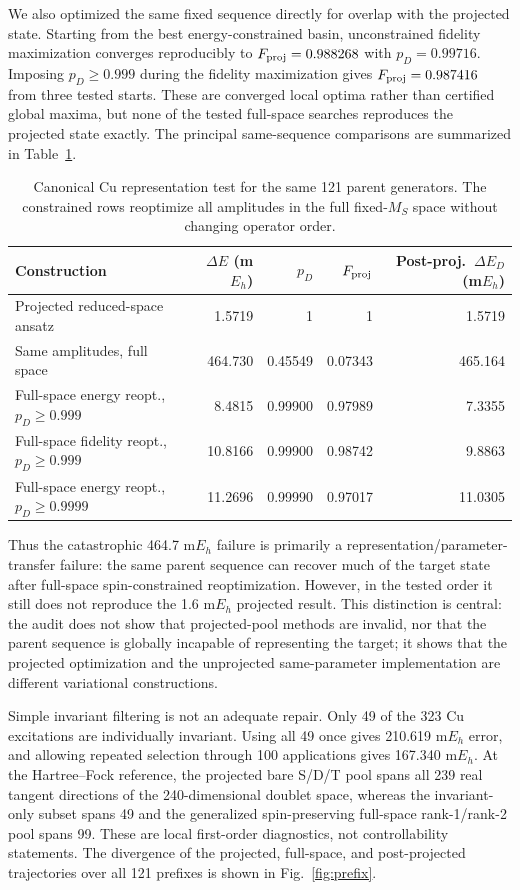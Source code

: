 \documentclass[
 aip,
 jcp,
 amsmath,amssymb,
 preprint
]{revtex4-2}
\begin{document}
We also optimized the same fixed sequence directly for overlap with the projected state.
Starting from the best energy-constrained basin, unconstrained fidelity maximization converges reproducibly to
$F_{\rm proj}=0.988268$ with $p_D=0.99716$.
Imposing $p_D\ge0.999$ during the fidelity maximization gives
$F_{\rm proj}=0.987416$ from three tested starts.
These are converged local optima rather than certified global maxima, but none of the tested full-space searches reproduces the projected state exactly.
The principal same-sequence comparisons are summarized in Table~\ref{tab:parent_reopt}.

\begin{table}[htbp]
\centering
\small
\caption{Canonical Cu representation test for the same 121 parent generators. The constrained rows reoptimize all amplitudes in the full fixed-$M_S$ space without changing operator order.}
\label{tab:parent_reopt}
\begin{tabular}{lrrrr}
\toprule
Construction & $\Delta E$ (m$E_h$) & $p_D$ & $F_{\rm proj}$ & Post-proj.\ $\Delta E_D$ (m$E_h$)\\
\midrule
Projected reduced-space ansatz & 1.5719 & 1 & 1 & 1.5719\\
Same amplitudes, full space & 464.730 & 0.45549 & 0.07343 & 465.164\\
Full-space energy reopt., $p_D\ge0.999$ & 8.4815 & 0.99900 & 0.97989 & 7.3355\\
Full-space fidelity reopt., $p_D\ge0.999$ & 10.8166 & 0.99900 & 0.98742 & 9.8863\\
Full-space energy reopt., $p_D\ge0.9999$ & 11.2696 & 0.99990 & 0.97017 & 11.0305\\
\bottomrule
\end{tabular}
\end{table}

Thus the catastrophic 464.7 m$E_h$ failure is primarily a representation/parameter-transfer failure: the same parent sequence can recover much of the target state after full-space spin-constrained reoptimization.
However, in the tested order it still does not reproduce the 1.6 m$E_h$ projected result.
This distinction is central: the audit does not show that projected-pool methods are invalid, nor that the parent sequence is globally incapable of representing the target; it shows that the projected optimization and the unprojected same-parameter implementation are different variational constructions.

Simple invariant filtering is not an adequate repair.
Only 49 of the 323 Cu excitations are individually invariant.
Using all 49 once gives 210.619 m$E_h$ error, and allowing repeated selection through 100 applications gives 167.340 m$E_h$.
At the Hartree--Fock reference, the projected bare S/D/T pool spans all 239 real tangent directions of the 240-dimensional doublet space, whereas the invariant-only subset spans 49 and the generalized spin-preserving full-space rank-1/rank-2 pool spans 99.
These are local first-order diagnostics, not controllability statements.
The divergence of the projected, full-space, and post-projected trajectories over all 121 prefixes is shown in Fig.~\ref{fig:prefix}.
\end{document}
